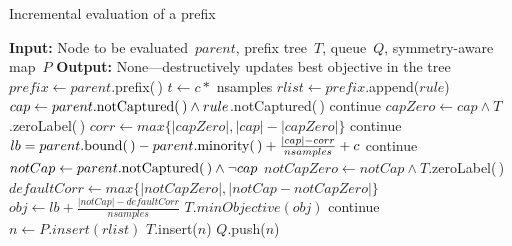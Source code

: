 \begin{algorithm}[t!]
  \caption{Incremental evaluation of a prefix}
\label{alg:incremental}
\begin{algorithmic}
\normalsize
\State \textbf{Input:} Node to be evaluated~$parent$,
prefix tree~$T$,
queue~$Q$,
symmetry-aware map~$P$
\State \textbf{Output:} None---destructively updates best objective in the tree\\
\State $prefix \gets parent$.prefix(\,)
\State $t \gets c *$ nsamples 
	\State $rlist \gets prefix$.append($rule$)
	\State $cap \gets parent\text{.notCaptured(\,)} \wedge rule$.notCaptured(\,)
	 
		\State continue
	\EndIf
	\State $capZero \gets cap \wedge T$.zeroLabel(\,) 
	\State $corr \gets max\{|capZero|, |cap| - |capZero|\}$
	 
		\State continue
	\EndIf
	\State $lb = parent.\text{bound(\,)} - parent.\text{minority(\,)} + \frac{|cap| - corr}{nsamples} + c$ 
	 
		\State continue
	\EndIf
	\State $notCap \gets parent\text{.notCaptured(\,)} \wedge \neg cap$
	\State $notCapZero \gets notCap \wedge T$.zeroLabel(\,)
	\State $defaultCorr \gets max\{|notCapZero|, |notCap - notCapZero|\}$
	\State $obj \gets lb + \frac{|notCap| - defaultCorr}{nsamples}$ 
	 
		\State $T.minObjective(obj)$
	\EndIf
	 
		\State continue
	\EndIf
	\State $n \gets P.insert(rlist)$ 
	 
		\State $T.$insert($n$)
		\State $Q.$push($n$)
	\EndIf
\EndFor
\end{algorithmic}
\end{algorithm}

